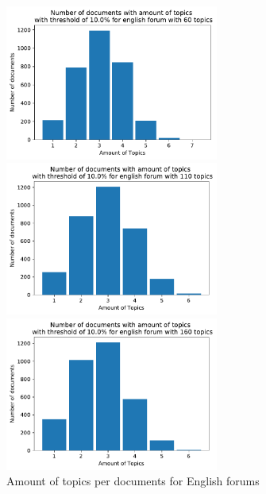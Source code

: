 \begin{figure}[t]
	\centering
	\includegraphics[width=7cm]{gfx/GrafikenFinal/englishforumlda_topPerdoc60.pdf}\par\medskip
	\begin{minipage}{0.5\textwidth}
		\centering
		\includegraphics[width=7cm]{gfx/GrafikenFinal/englishforumlda_topPerdoc110.pdf}
	\end{minipage}%
	\begin{minipage}{0.5\textwidth}
		\centering
		\includegraphics[width=7cm]{gfx/GrafikenFinal/englishforumlda_topPerdoc160.pdf}
	\end{minipage}
	\caption[]{Amount of topics per documents for English forums}
\end{figure}
